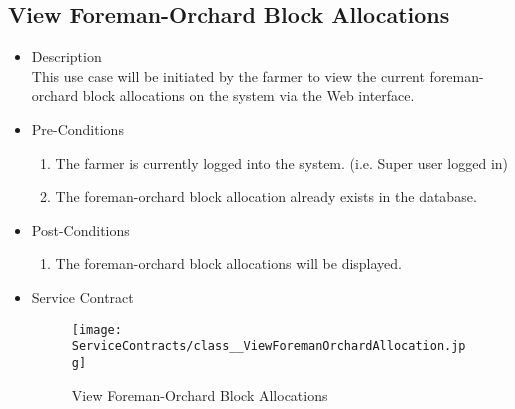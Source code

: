 \documentclass[11pt,fleqn]{book} %
\begin{document}
\subsection{View Foreman-Orchard Block Allocations}
\begin{itemize}
	\item Description\\
	This use case will be initiated by the farmer to view the current foreman-orchard block allocations on the system via the Web interface.
	\item Pre-Conditions
	\begin{enumerate}
		\item The farmer is currently logged into the system. (i.e. Super user logged in)
		\item The foreman-orchard block allocation already exists in the database.		
	\end{enumerate}
	\item Post-Conditions
	\begin{enumerate}
		\item The foreman-orchard block allocations will be displayed.
	\end{enumerate}
	\item Service Contract
	\begin{figure}
		\texttt{[image: ServiceContracts/class\_\_ViewForemanOrchardAllocation.jpg]}
		\caption{View Foreman-Orchard Block Allocations}
	\end{figure}
\end{itemize}
\end{document}

